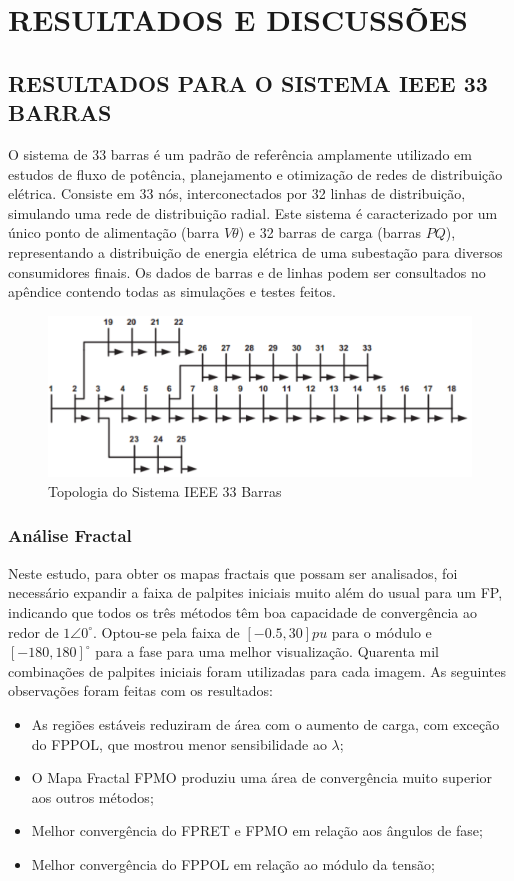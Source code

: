 \chapter{RESULTADOS E DISCUSSÕES}\label{cap:cap4}  
\section{RESULTADOS PARA O SISTEMA IEEE 33 BARRAS}
O sistema de 33 barras é um padrão de referência amplamente utilizado em estudos de fluxo de potência, planejamento e otimização de redes de distribuição elétrica. Consiste em 33 nós, interconectados por 32 linhas de distribuição, simulando uma rede de distribuição radial. Este sistema é caracterizado por um único ponto de alimentação (barra $V\theta$) e 32 barras de carga (barras $PQ$), representando a distribuição de energia elétrica de uma subestação para diversos consumidores finais. Os dados de barras e de linhas podem ser consultados no apêndice contendo todas as simulações e testes feitos.
\begin{figure}[H]
    \centering
    \includegraphics[scale=0.6]{textuais/capitulo4/figuras/IEEE_33BUS.pdf}
    \caption{Topologia do Sistema IEEE 33 Barras}
    \label{fig:14_BUS}
\end{figure}
\subsection{Análise Fractal}
Neste estudo, para obter os mapas fractais que possam ser analisados, foi necessário expandir a faixa de palpites iniciais muito além do usual para um \ac{FP}, indicando que todos os três métodos têm boa capacidade de convergência ao redor de $1 \angle 0^ \circ$. Optou-se pela faixa de $[-0.5, 30]pu$ para o módulo e $[-180, 180]^\circ$ para a fase para uma melhor visualização. Quarenta mil combinações de palpites iniciais foram utilizadas para cada imagem. As seguintes observações foram feitas com os resultados:
\begin{itemize}
    \item As regiões estáveis reduziram de área com o aumento de carga, com exceção do \acs{FPPOL}, que mostrou menor sensibilidade ao $\lambda$;
    \item O Mapa Fractal \acs{FPMO} produziu uma área de convergência muito superior aos outros métodos;
    \item Melhor convergência do \acs{FPRET} e \acs{FPMO} em relação aos ângulos de fase;
    \item Melhor convergência do \acs{FPPOL} em relação ao módulo da tensão;
\end{itemize}




